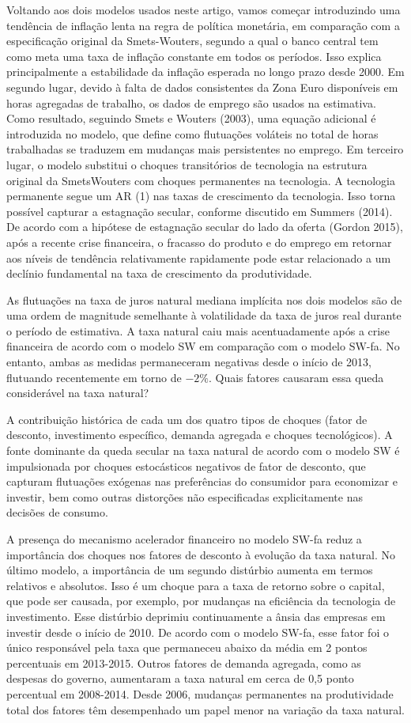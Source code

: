 Voltando aos dois modelos usados neste artigo, vamos começar introduzindo uma tendência de inflação lenta na regra de política monetária, em comparação com a especificação original da Smets-Wouters, segundo a qual o banco central tem como meta uma taxa de inflação constante em todos os períodos. Isso explica principalmente a estabilidade da inflação esperada no longo prazo desde 2000. Em segundo lugar, devido à falta de dados consistentes da Zona Euro disponíveis em horas agregadas de trabalho, os dados de emprego são usados na estimativa. Como resultado, seguindo Smets e Wouters (2003), uma equação adicional é introduzida no modelo, que define como flutuações voláteis no total de horas trabalhadas se traduzem em mudanças mais persistentes no emprego. Em terceiro lugar, o modelo substitui o
choques transitórios de tecnologia na estrutura original da SmetsWouters com choques permanentes na tecnologia. A tecnologia permanente segue um AR (1) nas taxas de crescimento da tecnologia. Isso torna possível capturar a estagnação secular, conforme discutido em Summers (2014). De acordo com a hipótese de estagnação secular do lado da oferta (Gordon 2015), após a recente crise financeira, o fracasso do produto e do emprego em retornar aos níveis de tendência relativamente rapidamente pode estar relacionado a um declínio fundamental na taxa de crescimento da produtividade.

As flutuações na taxa de juros natural mediana implícita nos dois modelos são de uma ordem de magnitude semelhante à volatilidade da taxa de juros real durante o período de estimativa. A taxa natural caiu mais acentuadamente após a crise financeira de acordo com o modelo SW em comparação com o modelo SW-fa. No entanto, ambas as medidas permaneceram negativas desde o início de 2013, flutuando recentemente em torno de $- 2\%$. Quais fatores causaram essa queda considerável na taxa natural?

A contribuição histórica de cada um dos quatro tipos de choques (fator de desconto, investimento específico, demanda agregada e choques tecnológicos). A fonte dominante da queda secular na taxa natural de acordo com o modelo SW é impulsionada por choques estocásticos negativos de fator de desconto, que capturam flutuações exógenas nas preferências do consumidor para economizar e investir, bem como outras distorções não especificadas explicitamente nas decisões de consumo.

A presença do mecanismo acelerador financeiro no modelo SW-fa reduz a importância dos choques nos fatores de desconto
à evolução da taxa natural. No último modelo, a importância de um segundo distúrbio aumenta em termos relativos e absolutos. Isso é um choque para a taxa de retorno sobre o capital, que pode ser causada, por exemplo, por mudanças na eficiência da tecnologia de investimento. Esse distúrbio deprimiu continuamente a ânsia das empresas em investir desde o início de 2010. De acordo com o modelo SW-fa, esse fator foi o único responsável pela taxa que permaneceu abaixo da média em 2 pontos percentuais em 2013-2015. Outros fatores de demanda agregada, como as despesas do governo, aumentaram a taxa natural em cerca de 0,5 ponto percentual em 2008-2014. Desde 2006, mudanças permanentes na produtividade total dos fatores têm desempenhado um papel menor na variação da taxa natural.
%
%

